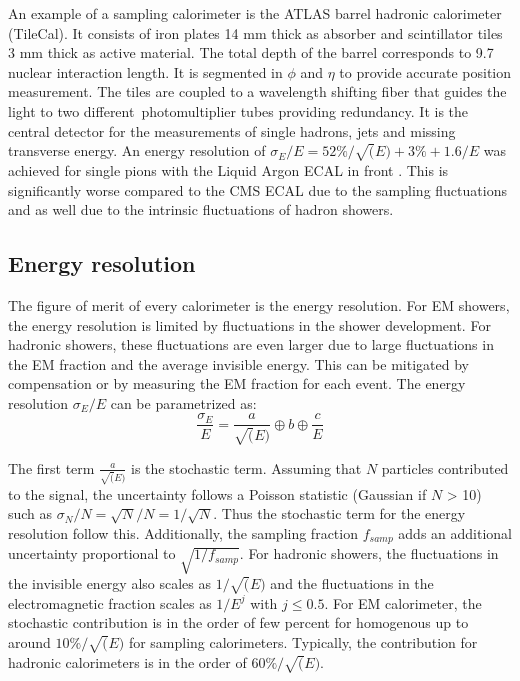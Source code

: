 An example of a sampling calorimeter is the ATLAS barrel hadronic calorimeter (TileCal). It consists of iron plates 14 mm thick as absorber and scintillator tiles 3 mm thick as active material. The total depth of the barrel corresponds to 9.7 nuclear interaction length. It is segmented in $\phi$ and $\eta$ to provide accurate position measurement. The tiles are coupled to a wavelength shifting fiber that guides the light to two different photomultiplier tubes providing redundancy. It is the central detector for the measurements of single hadrons, jets and missing transverse energy. An energy resolution of $\sigma_E/E = 52\%/\sqrt(E) + 3\% + 1.6/E$ was achieved for single pions with the Liquid Argon ECAL in front \cite{Henriques:2015fso}. This is significantly worse compared to the CMS ECAL due to the sampling fluctuations and as well due to the intrinsic fluctuations of hadron showers.

\subsection{Energy resolution}
\label{subsec:EnergyReso}

The figure of merit of every calorimeter is the energy resolution. For EM showers, the energy resolution is limited by fluctuations in the shower development. For hadronic showers, these fluctuations are even larger due to large fluctuations in the EM fraction and the average invisible energy. This can be mitigated by compensation or by measuring the EM fraction for each event.
The energy resolution $\sigma_E/E$ can be parametrized as:
\begin{equation} \label{eq:EnergyReso}
  \frac{\sigma_E}{E} = \frac{a}{\sqrt(E)} \oplus b \oplus \frac{c}{E}
\end{equation}

The first term $\frac{a}{\sqrt(E)}$ is the stochastic term. Assuming that $N$ particles contributed to the signal, the uncertainty follows a Poisson statistic (Gaussian if $N$ > 10) such as $\sigma_N/N = \sqrt{N}/N = 1/\sqrt{N}$. Thus the stochastic term for the energy resolution follow this. Additionally, the sampling fraction $f_{samp}$ adds an additional uncertainty proportional to $\sqrt{1/f_{samp}}$. For hadronic showers, the fluctuations in the invisible energy also scales as $1/\sqrt(E)$ and the fluctuations in the electromagnetic fraction scales as $1/E^j$ with $j \leq 0.5$. For EM calorimeter, the stochastic contribution is in the order of few percent for homogenous up to around $10\%/\sqrt(E)$ for sampling calorimeters. Typically, the contribution for hadronic calorimeters is in the order of $60\%/\sqrt(E)$.

